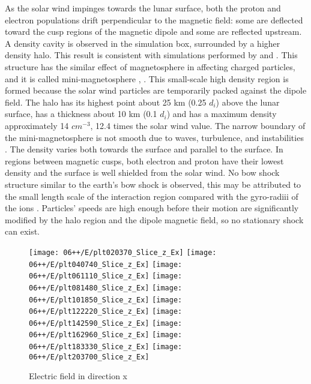 As the solar wind impinges towards the lunar surface, both the proton and electron populations drift perpendicular to the magnetic field: some are deflected toward the cusp regions of the magnetic dipole and some are reflected upstream. A density cavity is observed in the simulation box, surrounded by a higher density halo. This result is consistent with simulations performed by \cite{decaGeneralMechanismDynamics2015} and \cite{bamford3DPICSIMULATIONS2016}. This structure has the similar effect of magnetosphere in affecting charged particles, and it is called mini-magnetosphere \citep{saitoSimultaneousObservationElectron2012}, \cite{linLunarSurfaceMagnetic1998}. This small-scale high density region is formed because the solar wind particles are temporarily packed against the dipole field. The halo has its highest point about 25 km (0.25 $d_i$) above the lunar surface, has a thickness about 10 km (0.1 $ d_i$) and has a maximum density approximately  14 $cm^{-3}$, 12.4 times the solar wind value. The narrow boundary of the mini-magnetosphere is not smooth due to waves, turbulence, and instabilities . The density varies both towards the surface and parallel to the surface. In regions between magnetic cusps, both electron and proton have their lowest density and the surface is well shielded from the solar wind. No bow shock structure similar to the earth's bow shock is observed, this may be attributed to the small length scale of the interaction region compared with the gyro-radiii of the ions \cite{kallioKineticSimulationsFinite2012}. Particles' speeds are high enough before their motion are significantly modified by the halo region and the dipole magnetic field, so no stationary shock can exist.

\begin{figure}
  \centering
  {\texttt{[image: 06++/E/plt020370\_Slice\_z\_Ex]}}
  {\texttt{[image: 06++/E/plt040740\_Slice\_z\_Ex]}}
  {\texttt{[image: 06++/E/plt061110\_Slice\_z\_Ex]}}
  {\texttt{[image: 06++/E/plt081480\_Slice\_z\_Ex]}}
  {\texttt{[image: 06++/E/plt101850\_Slice\_z\_Ex]}}
  {\texttt{[image: 06++/E/plt122220\_Slice\_z\_Ex]}}
  {\texttt{[image: 06++/E/plt142590\_Slice\_z\_Ex]}}
  {\texttt{[image: 06++/E/plt162960\_Slice\_z\_Ex]}}
  {\texttt{[image: 06++/E/plt183330\_Slice\_z\_Ex]}}
  {\texttt{[image: 06++/E/plt203700\_Slice\_z\_Ex]}}
  \caption{Electric field in direction x}\label{fig:06++_Ex}
\end{figure}

